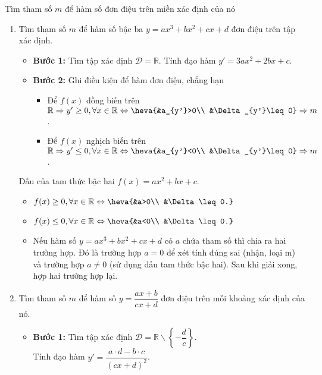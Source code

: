 \begin{dang}{Tìm tham số $m$ để hàm số đơn điệu trên miền xác định của nó}
    \begin{enumerate}
        \item Tìm tham số $m$ để hàm số bậc ba $y=a x^3+b x^2+c x+d$ đơn điệu trên tập xác định.
        \begin{itemize}
            \item \textbf{Bước 1: } Tìm tập xác định $\mathscr{D}=\mathbb{R}$. Tính đạo hàm $y'=3a x^2+2b x+c$.
            \item \textbf{Bước 2: } Ghi điều kiện để hàm đơn điệu, chẳng hạn
            \begin{itemize}
                \item Để $f (x)$ đồng biến trên $\mathbb{R}\Rightarrow y'\geq 0,\forall x\in\mathbb{R}\Leftrightarrow\heva{&a_{y'}>0\\ &\Delta_{y'}\leq 0}\Rightarrow m$.
                \item Để $f (x)$ nghịch biến trên $\mathbb{R}\Rightarrow y'\leq 0,\forall x\in\mathbb{R}\Leftrightarrow\heva{&a_{y'}<0\\ &\Delta_{y'}\leq 0}\Rightarrow m $.
            \end{itemize}
        \end{itemize}
        \begin{note}
            Dấu của tam thức bậc hai $f(x)=a x^2+b x+c$.
            \begin{itemize}
                \item $f(x)\geq 0,\forall x\in\mathbb{R}\Leftrightarrow\heva{&a>0\\ &\Delta\leq 0.}$
                \item $f(x)\leq 0,\forall x\in\mathbb{R}\Leftrightarrow\heva{&a<0\\ &\Delta\leq 0.}$
                \item Nếu hàm số $y=a x^3+b x^2+c x+d$ có $a$ chứa tham số thì chia ra hai trường hợp. Đó là trường hợp $a = 0$ để xét tính đúng sai (nhận, loại m) và trường hợp $a\ne 0$ (sử dụng dấu tam thức bậc hai). Sau khi giải xong, hợp hai trường hợp lại.
            \end{itemize}
        \end{note}
        \item Tìm tham số $m$ để hàm số $y=\dfrac{a x+b}{c x+d}$ đơn điệu trên mỗi khoảng xác định của nó.
        \begin{itemize}
            \item \textbf{Bước 1: } Tìm tập xác định $\mathscr{D}=\mathbb{R}\backslash\left\{-\dfrac dc\right\}$.\\ Tính đạo hàm $y'=\dfrac{a\cdot d-b\cdot c}{(c x+d)^2}$.

\end{itemize}
\end{enumerate}
\end{dang}
